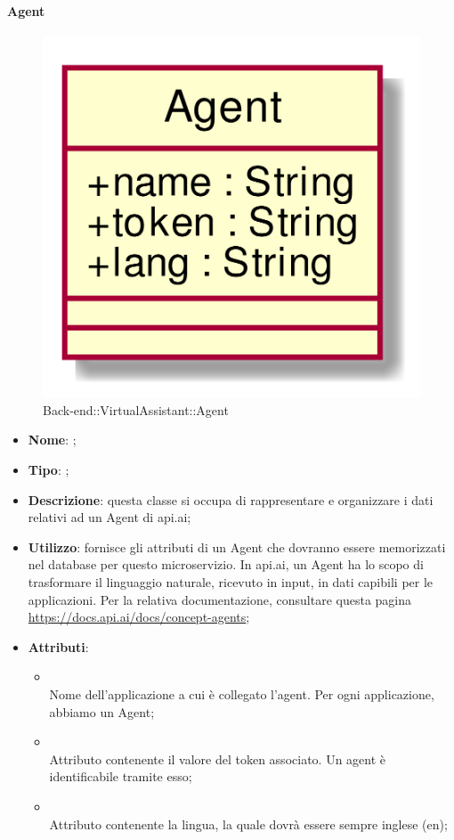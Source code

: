 \hypertarget{Agent_label}{\paragraph{Agent}}
\begin{figure}[h]
	\centering
	\includegraphics[width=\textwidth,height=\textheight,keepaspectratio]{images/ClassAgent.png}
	\caption{Back-end::VirtualAssistant::Agent}
\end{figure}
\begin{itemize}
	\item \textbf{Nome}: ;
	\item \textbf{Tipo}: ;
	\item \textbf{Descrizione}: questa classe si occupa di rappresentare e organizzare i dati relativi ad un Agent di api.ai;
	\item \textbf{Utilizzo}: fornisce gli attributi di un Agent che dovranno essere memorizzati nel database per questo microservizio.
In api.ai, un Agent ha lo scopo di trasformare il linguaggio naturale, ricevuto in input, in dati capibili per le applicazioni.
Per la relativa documentazione, consultare questa pagina \url{https://docs.api.ai/docs/concept-agents};
	\item \textbf{Attributi}:
	\begin{itemize}
		\item[]  \\
		Nome dell'applicazione a cui è collegato l'agent.
Per ogni applicazione, abbiamo un Agent;
		\item[]  \\
		Attributo contenente il valore del token associato. Un agent è identificabile tramite esso;
		\item[]  \\
		Attributo contenente la lingua, la quale dovrà essere sempre inglese (en);
	\end{itemize}
\end{itemize}
\FloatBarrier

